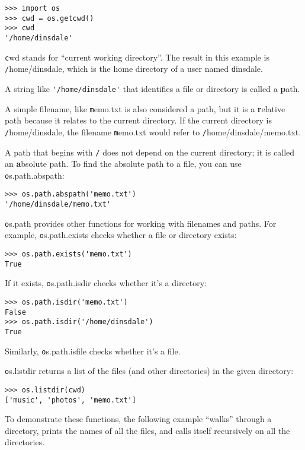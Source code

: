 \documentclass[
DIV=11,
fontsize=12,
twoside,
headinclude=false,
titlepage=firstiscover,
abstract=true,
headsepline=true,
footsepline=true,
chapterprefix=true, %
headings=big,
bibliography=totoc,%
captions=tableheading
]{scrbook}
\theoremstyle{definition}
\begin{document}
\begin{lstlisting}
>>> import os
>>> cwd = os.getcwd()
>>> cwd
'/home/dinsdale'
\end{lstlisting}
%
{\texttt cwd} stands for ``current working directory''.  The result in
this example is {\texttt /home/dinsdale}, which is the home directory of a
user named {\texttt dinsdale}.

A string like \verb"'/home/dinsdale'" that identifies a file or
directory is called a {\textbf path}.

A simple filename, like {\texttt memo.txt} is also considered a path,
but it is a {\textbf relative path} because it relates to the current
directory.  If the current directory is {\texttt /home/dinsdale}, the
filename {\texttt memo.txt} would refer to {\texttt /home/dinsdale/memo.txt}.
 
 

A path that begins with {\texttt /} does not depend on the current
directory; it is called an {\textbf absolute path}.  To find the absolute
path to a file, you can use {\texttt os.path.abspath}:

\begin{lstlisting}
>>> os.path.abspath('memo.txt')
'/home/dinsdale/memo.txt'
\end{lstlisting}
%
{\texttt os.path} provides other functions for working with filenames
and paths.  For example,
{\texttt os.path.exists} checks
whether a file or directory exists:

\begin{lstlisting}
>>> os.path.exists('memo.txt')
True
\end{lstlisting}
%
If it exists, {\texttt os.path.isdir} checks whether it's a directory:

\begin{lstlisting}
>>> os.path.isdir('memo.txt')
False
>>> os.path.isdir('/home/dinsdale')
True
\end{lstlisting}
%
Similarly, {\texttt os.path.isfile} checks whether it's a file.

{\texttt os.listdir} returns a list of the files (and other directories)
in the given directory:

\begin{lstlisting}
>>> os.listdir(cwd)
['music', 'photos', 'memo.txt']
\end{lstlisting}
%
To demonstrate these functions, the following example
``walks'' through a directory, prints
the names of all the files, and calls itself recursively on
all the directories.
\end{document}
